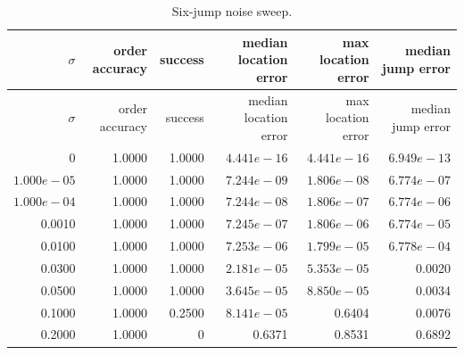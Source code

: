 {\scriptsize\setlength{\tabcolsep}{3pt}
\begin{longtable}{rrrrrr}
\caption{Six-jump noise sweep.}\label{tab:one-d-noise}\\
\toprule
$\sigma$ & order accuracy & success & median location error & max location error & median jump error\\
\midrule\endfirsthead
\toprule $\sigma$ & order accuracy & success & median location error & max location error & median jump error\\\midrule\endhead
0 & 1.0000 & 1.0000 & $4.441e-16$ & $4.441e-16$ & $6.949e-13$\\
$1.000e-05$ & 1.0000 & 1.0000 & $7.244e-09$ & $1.806e-08$ & $6.774e-07$\\
$1.000e-04$ & 1.0000 & 1.0000 & $7.244e-08$ & $1.806e-07$ & $6.774e-06$\\
0.0010 & 1.0000 & 1.0000 & $7.245e-07$ & $1.806e-06$ & $6.774e-05$\\
0.0100 & 1.0000 & 1.0000 & $7.253e-06$ & $1.799e-05$ & $6.778e-04$\\
0.0300 & 1.0000 & 1.0000 & $2.181e-05$ & $5.353e-05$ & 0.0020\\
0.0500 & 1.0000 & 1.0000 & $3.645e-05$ & $8.850e-05$ & 0.0034\\
0.1000 & 1.0000 & 0.2500 & $8.141e-05$ & 0.6404 & 0.0076\\
0.2000 & 1.0000 & 0 & 0.6371 & 0.8531 & 0.6892\\
\bottomrule
\end{longtable}
}